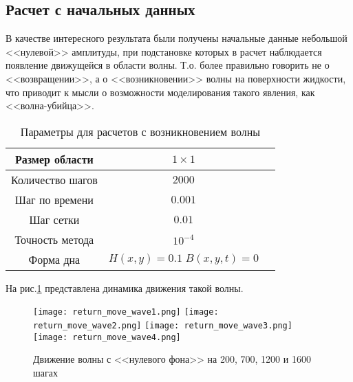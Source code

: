 \addtocounter{subsection}{1}
\subsection*{Расчет с начальных данных}

В качестве интересного результата были получены начальные данные небольшой <<нулевой>> амплитуды, при подстановке которых в расчет наблюдается появление движущейся в области волны. Т.о. более правильно говорить не о <<возвращении>>, а о <<возникновении>> волны на поверхности жидкости, что приводит к мысли о возможности моделирования такого явления, как <<волна-убийца>>.

\begin{table}[H]
    \label{tab:FirstResult}
    \caption{Параметры для расчетов с возникновением волны}
    \begin{center}
	\begin{tabular}{|c|c|c|}
	    \hline
	    Размер области & $1\times1$\\
	    \hline
	    Количество шагов & $2000$\\
	    \hline
	    Шаг по времени & $0.001$\\
	    \hline
	    Шаг сетки & $0.01$\\
	    \hline
	    Точность метода & $10^{-4}$\\
	    \hline
	    Форма дна & $H(x,y)=0.1\;B(x,y,t)=0$\\
	    \hline
	\end{tabular}
    \end{center}
\end{table}

На рис.\ref{fig:ReturnMoveWave} представлена динамика движения такой волны.

\newpage
\begin{figure}[H]
    \centering
    \vspace{12em}
    \texttt{[image: return\_move\_wave1.png]}
    \texttt{[image: return\_move\_wave2.png]}
    \texttt{[image: return\_move\_wave3.png]}
    \texttt{[image: return\_move\_wave4.png]}
    \caption{Движение волны с <<нулевого фона>> на 200, 700, 1200 и 1600 шагах}
    \label{fig:ReturnMoveWave}
\end{figure}

